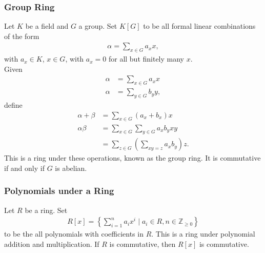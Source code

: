 \documentclass[8pt]{extarticle}
\newcommand{\Z}{\mathbb{Z}}
\begin{document}
  \subsubsection{Group Ring}%
  Let $K$ be a field and $G$ a group. Set $K[G]$ to be all formal linear combinations of the form
  \begin{align*}
    \alpha = \sum_{x\in G} a_x x,
  \end{align*}
  with $a_x\in K$, $x\in G$, with $a_x = 0$ for all but finitely many $x$.\\

  Given
  \begin{align*}
    \alpha &= \sum_{x\in G}a_x x\\
    \alpha &= \sum_{y\in G}b_y y,
  \end{align*}
  define
  \begin{align*}
    \alpha + \beta &= \sum_{x\in G}(a_x + b_x) x\\
    \alpha\beta &= \sum_{x\in G}\sum_{y\in G}a_xb_yxy\\
                &= \sum_{z\in G}\left(\sum_{xy=z}a_xb_y\right)z.
  \end{align*}
  This is a ring under these operations, known as the group ring. It is commutative if and only if $G$ is abelian.
  \subsubsection{Polynomials under a Ring}%
  Let $R$ be a ring. Set
  \begin{align*}
    R[x] = \left\{\sum_{i=1}^{n}a_ix^i\mid a_i\in R,n\in \Z_{\geq 0}\right\}
  \end{align*}
  to be the all polynomials with coefficients in $R$. This is a ring under polynomial addition and multiplication. If $R$ is commutative, then $R[x]$ is commutative.\\
\end{document}
